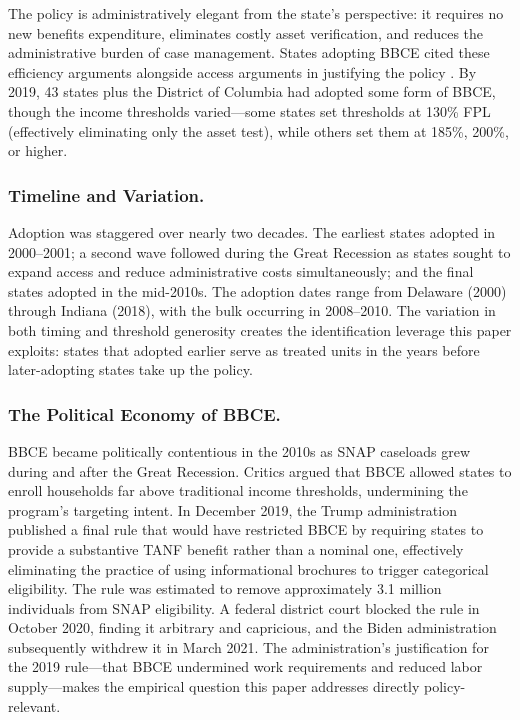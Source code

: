 \documentclass[12pt]{article}
\begin{document}
The policy is administratively elegant from the state's perspective: it requires no new benefits expenditure, eliminates costly asset verification, and reduces the administrative burden of case management. States adopting BBCE cited these efficiency arguments alongside access arguments in justifying the policy \citep{klerman2012snap}. By 2019, 43 states plus the District of Columbia had adopted some form of BBCE, though the income thresholds varied---some states set thresholds at 130\% FPL (effectively eliminating only the asset test), while others set them at 185\%, 200\%, or higher.

\subsubsection*{Timeline and Variation.} Adoption was staggered over nearly two decades. The earliest states adopted in 2000--2001; a second wave followed during the Great Recession as states sought to expand access and reduce administrative costs simultaneously; and the final states adopted in the mid-2010s. The adoption dates range from Delaware (2000) through Indiana (2018), with the bulk occurring in 2008--2010. The variation in both timing and threshold generosity creates the identification leverage this paper exploits: states that adopted earlier serve as treated units in the years before later-adopting states take up the policy.

\subsubsection*{The Political Economy of BBCE.} BBCE became politically contentious in the 2010s as SNAP caseloads grew during and after the Great Recession. Critics argued that BBCE allowed states to enroll households far above traditional income thresholds, undermining the program's targeting intent. In December 2019, the Trump administration published a final rule that would have restricted BBCE by requiring states to provide a substantive TANF benefit rather than a nominal one, effectively eliminating the practice of using informational brochures to trigger categorical eligibility. The rule was estimated to remove approximately 3.1 million individuals from SNAP eligibility. A federal district court blocked the rule in October 2020, finding it arbitrary and capricious, and the Biden administration subsequently withdrew it in March 2021. The administration's justification for the 2019 rule---that BBCE undermined work requirements and reduced labor supply---makes the empirical question this paper addresses directly policy-relevant.
\end{document}
